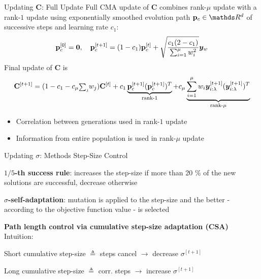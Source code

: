 \documentclass[11pt,compress,t,notes=noshow, xcolor=table]{beamer}
\begin{document}
\begin{framev}[fs=small]{Updating $\mathbf{C}$: Full Update}
Full CMA update of $\mathbf{C}$ combines rank-$\mu$ update with a rank-$1$ update using exponentially smoothed evolution path $\mathbf{p}_c \in \R^{d}$ of successive steps and learning rate $c_1$:
$$
\mathbf{p}_{c}^{[0]}=\bm{0}, \quad \mathbf{p}_{c}^{[t+1]} = (1-c_1)\mathbf{p}_{c}^{[t]} + \sqrt{\frac{c_1(2-c_1)}{\sum_{i=1}^{\mu}w_i^2}}\bm{y}_w
$$
Final update of $\mathbf{C}$ is
$$
\mathbf{C}^{[t+1]}=(1-c_1-c_{\mu}{\scriptstyle\sum_j} w_j)\mathbf{C}^{[t]}+c_1 \underbrace{\mathbf{p}_{c}^{[t+1]}(\mathbf{p}_{c}^{[t+1]})^T}_{\text{rank-$1$}}+c_{\mu}\underbrace{\sum_{i=1}^{\mu}w_i \bm{y}_{i:\lambda}^{[t+1]}(\bm{y}_{i:\lambda}^{[t+1]})^T}_{\text{rank-$\mu$}}
$$
\begin{itemize}
\item Correlation between generations used in rank-$1$ update
\item Information from entire population is used in rank-$\mu$ update
\end{itemize}
\end{framev}


\begin{framei}[sep=L, fs=small]{Updating $\sigma$: Methods Step-Size Control}
\item \textbf{$1/5$-th success rule}: increases the step-size if more than 20 \% of the new solutions are successful, decrease otherwise
\item \textbf{$\sigma$-self-adaptation}: mutation is applied to the step-size and the better - according to the objective function value - is selected
\item \textbf{Path length control via cumulative step-size adaptation (CSA)}\\ Intuition:
\begin{itemizeS}
\item Short cumulative step-size $\triangleq$ steps cancel $\to$ decrease $\sigma^{[t+1]}$
\item Long cumulative step-size $\triangleq$ corr. steps $\to$ increase $\sigma^{[t+1]}$
\end{itemizeS}
\vfill
{}
\end{framei}


\endlecture
\end{document}
